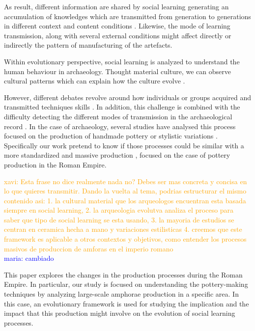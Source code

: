 \documentclass[review]{elsarticle}
\newcommand{\memo}[2]{\textcolor{#1}{#2}}
\newcommand{\xavi}[1]{\memo{orange}{xavi: #1\\}}
\newcommand{\maria}[1]{\memo{blue}{maria: #1\\}}
\begin{document}



As result, different information are shared by social learning generating an accumulation of knowledges which are transmitted from generation to generations in different context and content conditions  \citep{eerkens_jelmer_cultural_2005, neff1992ceramics,henrich_evolution_2003, boyd_cultural_2011}. Likewise, the mode of learning transmission, along with several external conditions might affect directly or indirectly the pattern of manufacturing of the artefacts.

Within evolutionary perspective, social learning is analyzed to understand the human behaviour in archaeology. Thought material culture, we can observe cultural patterns which can explain how the culture evolve \citep{richerson2005not}.


However, different debates revolve around how individuals or groups acquired and transmitted techniques skills  \citep{bowser_learning_2008, mesoudi_cultural_2008}. In addition, this challenge is combined with the difficulty detecting the different modes of transmission in the archaeological record \citep{roux_standardization_2015}. In the case of archaeology, several studies have analysed this process focused on the production of handmade pottery \citep{steele_james_ceramic_2010} or stylistic variations \citep{neiman_stylistic_1995, shennan_ceramic_2001}. Specifically our work pretend to know if those processes could be similar with a more standardized and massive production \citep{gandon_copying_2014}, focused on the case of pottery production in the Roman Empire. 


\xavi{Esta frase no dice realmente nada no? Debes ser mas concreta y concisa en lo que quieres transmitir. Dando la vuelta al tema, podrias estructurar el mismo contenido asi: 1. la cultural material que los arqueologos encuentran esta basada siempre en social learning, 2. la arqueologia evolutva analiza el proceso para saber que tipo de social learning se esta usando, 3. la mayoria de estudios se centran en ceramica hecha a mano y variaciones estilisticas 4. creemos que este framework es aplicable a otros contextos y objetivos, como entender los procesos masivos de produccion de amforas en el imperio romano}
\maria{cambiado}

                       
This paper explores the changes in the production processes during the Roman Empire. In particular, our study is focused on understanding the pottery-making techniques by analyzing large-scale amphorae production in a specific  area. In this case, an evolutionary framework is used for studying the implication and the impact that this production might involve on the  evolution of social learning processes.  
\end{document}
